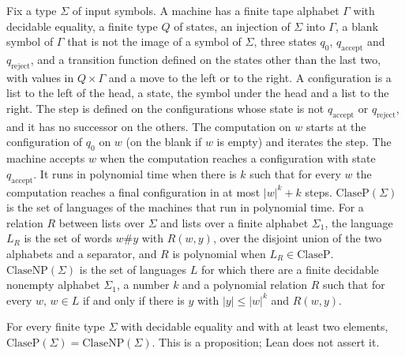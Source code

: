 \begin{definition}
  \label{def:machines-cook}
  \leanok
  Fix a type $\Sigma$ of input symbols. A machine has a finite tape alphabet $\Gamma$ with decidable equality,
  a finite type $Q$ of states, an injection of $\Sigma$ into $\Gamma$, a blank symbol of $\Gamma$ that is not
  the image of a symbol of $\Sigma$, three states $q_0$, $q_{\mathrm{accept}}$ and $q_{\mathrm{reject}}$, and a
  transition function defined on the states other than the last two, with values in $Q \times \Gamma$
  and a move to the left or to the right. A configuration is a list to the left of the head, a state, the symbol
  under the head and a list to the right. The step is defined on the configurations whose state is not
  $q_{\mathrm{accept}}$ or $q_{\mathrm{reject}}$, and it has no successor on the others. The
  computation on $w$ starts at the configuration of $q_0$ on $w$ (on the blank if $w$ is empty) and
  iterates the step. The machine accepts $w$ when the computation reaches a configuration with state
  $q_{\mathrm{accept}}$. It runs in polynomial time when there is $k$ such that for every $w$ the computation
  reaches a final configuration in at most $|w|^k + k$ steps. $\mathrm{ClaseP}(\Sigma)$ is the set of languages
  of the machines that run in polynomial time. For a relation $R$ between lists over $\Sigma$ and lists over a
  finite alphabet $\Sigma_1$, the language $L_R$ is the set of words $w \# y$ with $R(w, y)$, over the
  disjoint union of the two alphabets and a separator, and $R$ is polynomial when $L_R \in
  \mathrm{ClaseP}$. $\mathrm{ClaseNP}(\Sigma)$ is the set of languages $L$ for which there are a finite
  decidable nonempty alphabet $\Sigma_1$, a number $k$ and a polynomial relation $R$ such that for every
  $w$, $w \in L$ if and only if there is $y$ with $|y| \le |w|^k$ and $R(w, y)$.
\end{definition}

\begin{definition}
  \label{def:machines-cook-pnp}
  \leanok
  For every finite type $\Sigma$ with decidable equality and with at least two elements,
  $\mathrm{ClaseP}(\Sigma) = \mathrm{ClaseNP}(\Sigma)$. This is a proposition; Lean does not assert it.
\end{definition}

